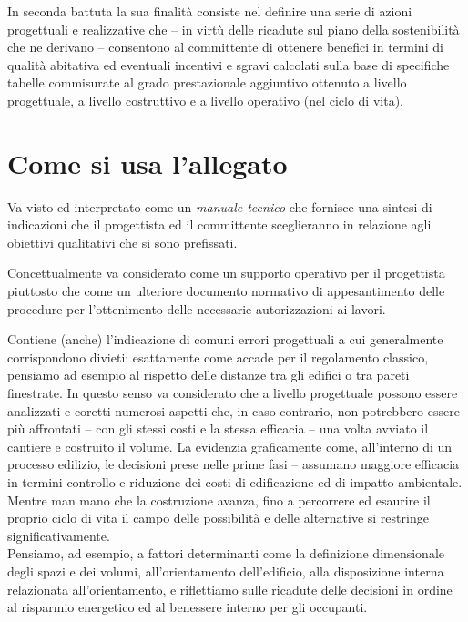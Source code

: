In seconda battuta la sua finalità consiste nel definire una serie di azioni progettuali e realizzative che – in virtù delle ricadute sul piano della sostenibilità che ne derivano – consentono al committente di ottenere benefici in termini di qualità abitativa ed eventuali incentivi e sgravi calcolati sulla base di specifiche tabelle commisurate al grado prestazionale aggiuntivo ottenuto a livello progettuale, a livello costruttivo e a livello operativo (nel ciclo di vita).

\section{Come si usa l'allegato}
\label{comesiusalallegato}

Va visto ed interpretato come un \emph{manuale tecnico} che fornisce una sintesi di indicazioni che il progettista ed il committente sceglieranno in relazione agli obiettivi qualitativi che si sono prefissati. 

Concettualmente va considerato come un supporto operativo per il progettista piuttosto che come un ulteriore documento normativo di appesantimento delle procedure per l'ottenimento delle necessarie autorizzazioni ai lavori.

Contiene (anche) l'indicazione di comuni errori progettuali a cui generalmente corrispondono divieti: esattamente come accade per il regolamento classico, pensiamo ad esempio al rispetto delle distanze tra gli edifici o tra pareti finestrate. In questo senso va considerato che a livello progettuale possono essere analizzati e coretti numerosi aspetti che, in caso contrario, non potrebbero essere più affrontati – con gli stessi costi e la stessa efficacia – una volta avviato il cantiere e costruito il volume. La  evidenzia graficamente come, all'interno di un processo edilizio, le decisioni prese nelle prime fasi – assumano  maggiore efficacia in termini controllo e riduzione dei costi di edificazione ed di impatto ambientale. Mentre man mano che la costruzione avanza, fino a percorrere ed esaurire il proprio ciclo di vita il campo delle possibilità e delle alternative si restringe significativamente. \\ Pensiamo, ad esempio, a fattori determinanti come la definizione dimensionale degli spazi e dei volumi, all'orientamento dell'edificio, alla disposizione interna relazionata all'orientamento, e riflettiamo sulle ricadute delle decisioni in ordine al risparmio energetico ed al benessere interno per gli occupanti.

